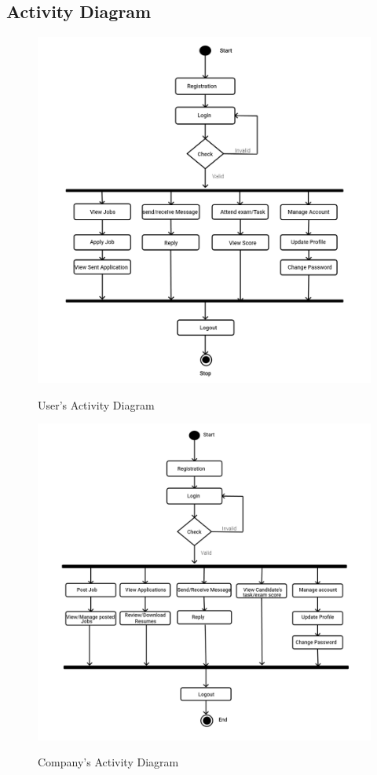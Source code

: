 \documentclass[a4paper,12pt]{report}
\begin{document}
\subsection{Activity Diagram}
\vspace*{12pt}

\begin{figure}[bph]
	\centering
	\includegraphics[width=.8\linewidth]{img/useractivity}
	\label{fig:useractivity}
    \caption{User's Activity Diagram}
\end{figure}

\pagebreak
{}
\vspace*{12pt}
\begin{figure}[bph]
	\centering
	\includegraphics[width=.8\linewidth]{img/cmpnyactivity}
	\label{fig:companyactivity}
	\caption{Company's Activity Diagram}
\end{figure}
\end{document}
